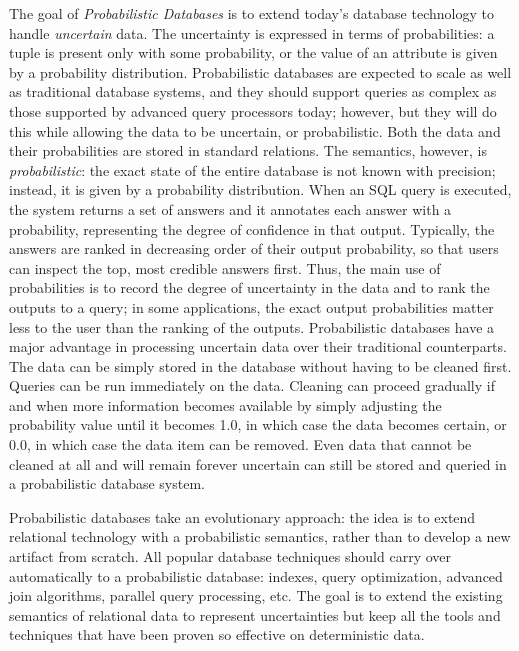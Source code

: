 The goal of \textit{Probabilistic Databases} is to extend today’s database technology to handle \textit{uncertain} data. 
The uncertainty is expressed in terms of probabilities: a tuple is present only with some probability, or the value of an attribute is given by a probability distribution. Probabilistic databases are expected to scale as well as traditional database systems, and they should support queries as complex as those supported by advanced query processors today; however, but they will do this while allowing the data to be uncertain, or probabilistic. Both the data and their probabilities are stored in standard relations. The semantics, however, is \textit{probabilistic}: the exact state of the entire database is not known with precision; instead, it is given by a probability distribution. 
When an SQL query is executed, the system returns a set of answers and it annotates each answer with a probability, representing the degree of confidence in that output. Typically, the answers are ranked in decreasing order of their output probability, so that users can inspect the top, most credible answers first. 
Thus, the main use of probabilities is to record the degree of uncertainty in the data and to rank the outputs to a query; in some applications, the exact output probabilities matter less to the user than the ranking of the outputs. Probabilistic databases have a major advantage in processing uncertain data over their traditional counterparts. The data can be simply stored in the database without having to be cleaned first. Queries can be run immediately on the data. Cleaning can proceed gradually if and when more information becomes available by simply adjusting the probability value until it becomes 1.0, in which case the data becomes certain, or 0.0, in which case the data item can be removed. Even data that cannot be cleaned at all and will remain forever uncertain can still be stored and queried in a probabilistic database system.

Probabilistic databases take an evolutionary approach: the idea is to extend relational technology with a probabilistic semantics, rather than to develop a new artifact from scratch. All popular database techniques should carry over automatically to a probabilistic database: indexes, query optimization, advanced join algorithms, parallel query processing, etc. The goal is to extend the existing semantics of relational data to represent uncertainties but keep all the tools and techniques that have been proven so effective on deterministic data. 

